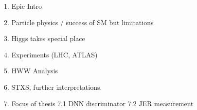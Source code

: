
1. Epic Intro

2. Particle physics / success of SM but limitations

3. Higgs takes special place

4. Experiments (LHC,  ATLAS)

5. HWW Analysis 

6. STXS, further interpretations. 

7. Focus of thesis
7.1 DNN discriminator
7.2 JER measurement


